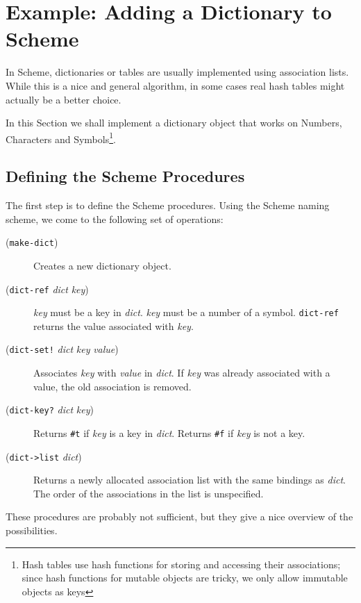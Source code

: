 \documentclass{report}
\newcommand{\code}[1]{\texttt{#1}}
\newcommand{\param}[1]{\textmd{\textit{#1}}}
\begin{document}
\section{Example: Adding a Dictionary to Scheme}
In Scheme, dictionaries or tables are usually implemented using
association lists. While this is a nice and general algorithm, in some
cases real hash tables might actually be a better choice.

In this Section we shall implement a dictionary object that works on
Numbers, Characters and Symbols\footnote{Hash tables use hash
functions for storing and accessing their associations; since hash
functions for mutable objects are tricky, we only allow immutable
objects as keys}.

\subsection{Defining the Scheme Procedures}
The first step is to define the Scheme procedures. Using the Scheme
naming scheme, we come to the following set of operations:

\begin{description}

\item[(\code{make-dict})] Creates a new dictionary object.

\item[(\code{dict-ref} \param{dict} \param{key})] \param{key} must be
a key in \param{dict}. \param{key} must be a number of a
symbol. \code{dict-ref} returns the value associated with \param{key}.

\item[(\code{dict-set!} \param{dict} \param{key} \param{value})]
Associates \param{key} with \param{value} in \param{dict}. If
\param{key} was already associated with a value, the old association
is removed.

\item[(\code{dict-key?} \param{dict} \param{key})] Returns \code{\#t}
if \param{key} is a key in \param{dict}. Returns \code{\#f} if
\param{key} is not a key.

\item[(\code{dict->list} \param{dict})] Returns a newly allocated
association list with the same bindings as \param{dict}. The order of
the associations in the list is unspecified.

\end{description}

These procedures are probably not sufficient, but they give a nice
overview of the possibilities.
\end{document}
